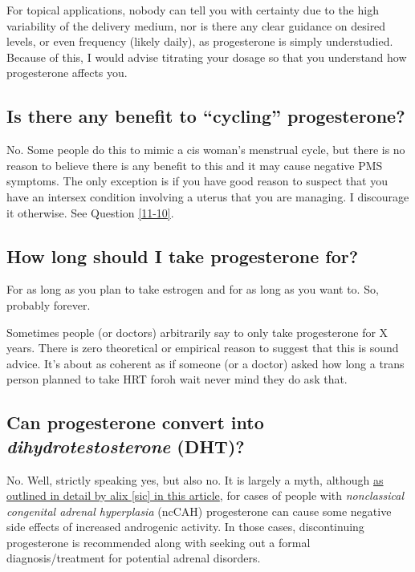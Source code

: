 \documentclass{article}
\begin{document}
For topical applications, nobody can tell you with certainty due to the high variability of the delivery medium, nor is there any clear guidance on desired levels, or even frequency (likely daily), as progesterone is simply understudied. Because of this, I would advise titrating your dosage so that you understand how progesterone affects you.

\subsection{Is there any benefit to “cycling” progesterone?}\label{8-11}

No. Some people do this to mimic a cis woman’s menstrual cycle, but there is no reason to believe there is any benefit to this and it may cause negative PMS symptoms. The only exception is if you have good reason to suspect that you have an intersex condition involving a uterus that you are managing. I discourage it otherwise. See Question \ref{11-10}.

\subsection{How long should I take progesterone for?}

For as long as you plan to take estrogen and for as long as you want to. So, probably forever.

Sometimes people (or doctors) arbitrarily say to only take progesterone for X years. There is zero theoretical or empirical reason to suggest that this is sound advice. It's about as coherent as if someone (or a doctor) asked how long a trans person planned to take HRT for\textemdash{}oh wait never mind they do ask that.

\subsection{Can progesterone convert into \textit{dihydrotestosterone} (DHT)?}

No. Well, strictly speaking yes, but also no. It is largely a myth, although \href{https://whsah.co/posts/rethinking-progesterone-and-androgens/}{as outlined in detail by alix [sic] in this article}, for cases of people with \textit{nonclassical congenital adrenal hyperplasia} (ncCAH) progesterone can cause some negative side effects of increased androgenic activity. In those cases, discontinuing progesterone is recommended along with seeking out a formal diagnosis/treatment for potential adrenal disorders.
\end{document}
